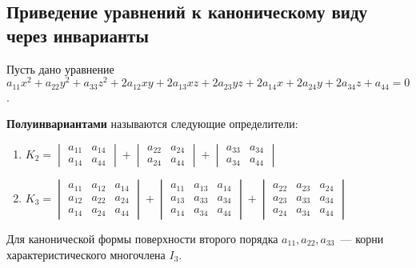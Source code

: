 \subsection{Приведение уравнений к каноническому виду через инварианты}
Пусть дано уравнение $a_{11} x^2 + a_{22} y^2 + a_{33} z^2 + 2 a_{12} xy + 2 a_{13} xz + 2 a_{23} yz + 2 a_{14} x + 2 a_{24} y + 2 a_{34} z + a_{44} = 0$.

\textbf{Полуинвариантами} называются следующие определители:
\begin{enumerate}
	\item $K_2 =
	\begin{vmatrix}
	a_{11} & a_{14} \\
	a_{14} & a_{44}
	\end{vmatrix} +
	\begin{vmatrix}
	a_{22} & a_{24} \\
	a_{24} & a_{44}
	\end{vmatrix} +
	\begin{vmatrix}
	a_{33} & a_{34} \\
	a_{34} & a_{44}
	\end{vmatrix}$
	
	\item $K_3 =
	\begin{vmatrix}
	a_{11} & a_{12} & a_{14} \\
	a_{12} & a_{22} & a_{24} \\
	a_{14} & a_{24} & a_{44}
	\end{vmatrix} +
	\begin{vmatrix}
	a_{11} & a_{13} & a_{14} \\
	a_{13} & a_{33} & a_{34} \\
	a_{14} & a_{34} & a_{44}
	\end{vmatrix} +
	\begin{vmatrix}
	a_{22} & a_{23} & a_{24} \\
	a_{23} & a_{33} & a_{34} \\
	a_{24} & a_{34} & a_{44}
	\end{vmatrix}$
\end{enumerate}

\begin{theorem}
Для канонической формы поверхности второго порядка $a_{11}, a_{22}, a_{33}$~--- корни характеристического многочлена $I_3$.
\end{theorem}

